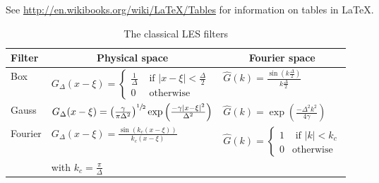 See \url{http://en.wikibooks.org/wiki/LaTeX/Tables} for information on tables in \LaTeX{}.


\begin{table}
	\centering
	\begin{tabular*}{0.8\textwidth}{ @{\extracolsep{\fill} } lll}
	\toprule
	Filter & \multicolumn{1}{c}{Physical space} & \multicolumn{1}{c}{Fourier space} \\
	\midrule
	Box 
		& $G_{\Delta}(x - \xi) = \begin{cases}
				\frac{1}{\Delta} & \text{ if } \vert x - \xi \vert < \frac{\Delta}{2} \\
				0 & \text{ otherwise}
			\end{cases}$ 
		& $\hat{G}(k) = \frac{\sin(k \frac{\Delta}{2})}{k \frac{\Delta}{2}}$ \\
	Gauss 
		& $G_{\Delta}(x - \xi) = \left( \frac{\gamma}{\pi \Delta^2} \right)^{\sfrac{1}{2}} 
			\exp\left( \frac{-\gamma \vert x - \xi \vert^2}{\Delta^2} \right)$
		& $\hat{G}(k) = \exp\left( \frac{-\Delta^2 k^2}{4 \gamma} \right)$ \\
	Fourier 
		& $G_{\Delta}(x - \xi) = \frac{\sin (k_c(x-\xi))}{k_c(x-\xi)}$
		& $\hat{G}(k) = \begin{cases}
				1 & \text{ if } \vert k \vert < k_c \\
				0 & \text{otherwise}
			\end{cases}$ \\
		& with $k_c = \frac{\pi}{\Delta}$ & \\
	\bottomrule
	\end{tabular*}
	\caption{The classical \ac{LES} filters}
	\label{tab:classicalLES_filters}
\end{table}




